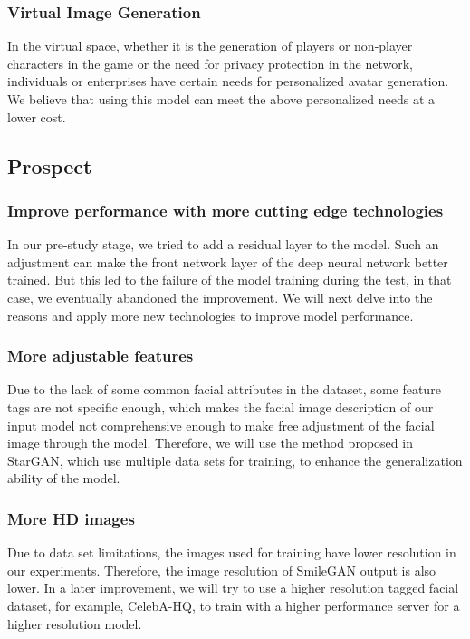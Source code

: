 \subsubsection*{Virtual Image Generation}
In the virtual space, whether it is the generation of players or non-player characters in the game or the need for privacy protection in the network, individuals or enterprises have certain needs for personalized avatar generation.
We believe that using this model can meet the above personalized needs at a lower cost.

\subsection{Prospect}
\subsubsection*{Improve performance with more cutting edge technologies}

In our pre-study stage, we tried to add a residual layer to the model.
Such an adjustment can make the front network layer of the deep neural network better trained.
But this led to the failure of the model training during the test, in that case, we eventually abandoned the improvement.
We will next delve into the reasons and apply more new technologies to improve model performance.


\subsubsection*{More adjustable features}

Due to the lack of some common facial attributes in the dataset, some feature tags are not specific enough, which makes the facial image description of our input model not comprehensive enough to make free adjustment of the facial image through the model.
Therefore, we will use the method proposed in StarGAN, which use multiple data sets for training, to enhance the generalization ability of the model.


\subsubsection*{More HD images}
Due to data set limitations, the images used for training have lower resolution in our experiments.
Therefore, the image resolution of SmileGAN output is also lower.
In a later improvement, we will try to use a higher resolution tagged facial dataset, for example, CelebA-HQ, to train with a higher performance server for a higher resolution model.

